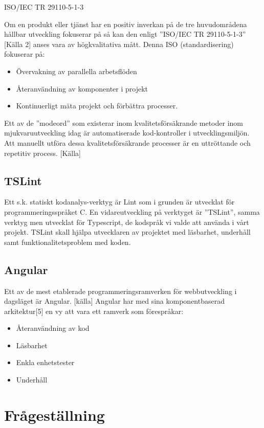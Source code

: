 ISO/IEC TR 29110-5-1-3

Om en produkt eller tjänst har en positiv inverkan på de tre huvudområdena hållbar utveckling fokuserar på så kan den enligt ”ISO/IEC TR 29110-5-1-3” [Källa 2] anses vara av högkvalitativa mått.  Denna ISO (standardisering) fokuserar på: 

\begin{itemize}
	\item Övervakning av parallella arbetsflöden
	\item Återanvändning av komponenter i projekt
	\item Kontinuerligt mäta projekt och förbättra processer.
\end{itemize}

Ett av de ”modeord” som existerar inom kvalitetsförsäkrande metoder inom mjukvaruutveckling idag är automatiserade kod-kontroller i utvecklingsmiljön. Att manuellt utföra dessa kvalitetsförsäkrande processer är en uttröttande och repetitiv process. [Källa]
\subsection{TSLint}
Ett s.k. statiskt kodanalys-verktyg är Lint som i grunden är utvecklat för programmeringsspråket C. En vidareutveckling på verktyget är ”TSLint”, samma verktyg men utvecklat för Typescript, de kodspråk vi valde att använda i vårt projekt. TSLint skall hjälpa utvecklaren av projektet med läsbarhet, underhåll samt funktionalitetsproblem med koden.

\subsection{Angular}
Ett av de mest etablerade programmeringsramverken för webbutveckling i dagsläget är Angular. [källa] Angular har med sina komponentbaserad arkitektur[5] en vy att vara ett ramverk som förespråkar:

\begin{itemize}
	\item Återanvändning av kod
	\item Läsbarhet
	\item Enkla enhetstester
	\item Underhåll
\end{itemize}


\section{Frågeställning}

